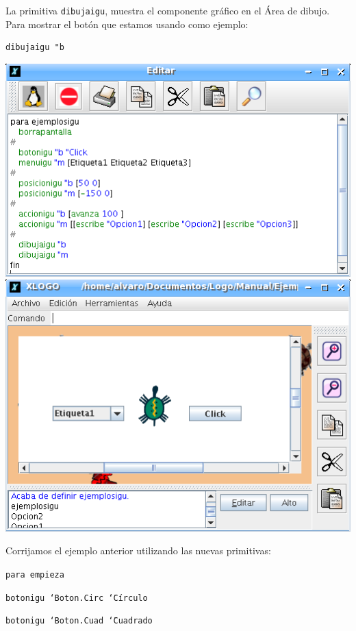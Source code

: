 La primitiva \texttt{dibujaigu}, 
muestra el componente gr\'afico en el \'Area de dibujo. Para mostrar el
bot\'on que estamos usando como ejemplo:
\begin{verbatim}
dibujaigu "b \end{verbatim}
\begin{center}
   \includegraphics[scale=0.45]{Imagenes/10_Usuario/EjemplosIGU_01.png} \hfill
   \includegraphics[scale=0.4]{Imagenes/10_Usuario/EjemplosIGU_02.png} 
\end{center}

Corrijamos el ejemplo anterior utilizando las nuevas primitivas:

\noindent \texttt{para empieza}

\texttt{botonigu \char`\"{}Boton.Circ \char`\"{}C\'irculo}

\texttt{botonigu \char`\"{}Boton.Cuad \char`\"{}Cuadrado}

